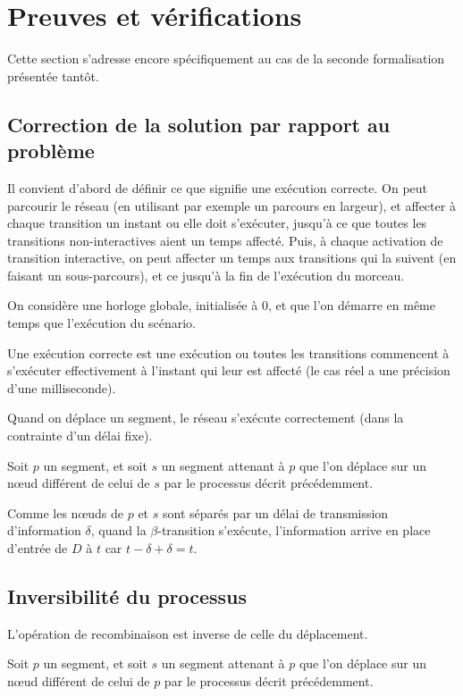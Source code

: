 \section{Preuves et vérifications}
Cette section s'adresse encore spécifiquement au cas de la seconde formalisation présentée tantôt.

\subsection{Correction de la solution par rapport au problème} 
Il convient d'abord de définir ce que signifie une exécution correcte.
On peut parcourir le réseau (en utilisant par exemple un parcours en largeur), et affecter à chaque transition un instant ou elle doit s'exécuter, jusqu'à ce que toutes les transitions non-interactives aient un temps affecté. Puis, à chaque activation de transition interactive, on peut affecter un temps aux transitions qui la suivent (en faisant un sous-parcours), et ce jusqu'à la fin de l'exécution du morceau.

On considère une horloge globale, initialisée à 0, et que l'on démarre en même temps que l'exécution du scénario.

Une exécution correcte est une exécution ou toutes les transitions commencent à s'exécuter effectivement à l'instant qui leur est affecté (le cas réel a une précision d'une milliseconde).

\begin{myth}
Quand on déplace un segment, le réseau s'exécute correctement (dans la contrainte d'un délai fixe).
\end{myth}

Soit $p$ un segment, et soit $s$ un segment attenant à $p$ que l'on déplace sur un nœud différent de celui de $s$ par le processus décrit précédemment.

Comme les nœuds de $p$ et $s$ sont séparés par un délai de transmission d'information $\delta$, quand la $\beta$-transition s'exécute, l'information arrive en place d'entrée de $D$ à $t$ car $t - \delta + \delta = t$.   

\subsection{Inversibilité du processus}
\begin{myth}
	L'opération de recombinaison est inverse de celle du déplacement.
\end{myth}
Soit $p$ un segment, et soit $s$ un segment attenant à $p$ que l'on déplace sur un nœud différent de celui de $p$ par le processus décrit précédemment.


